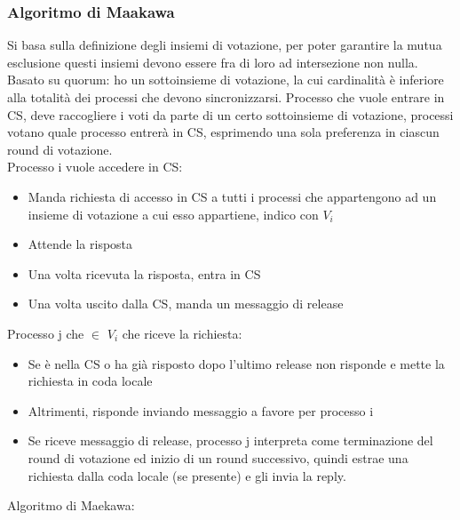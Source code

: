 \documentclass[16px]{article}
\begin{document}
\subsubsection{Algoritmo di Maakawa}
Si basa sulla definizione degli insiemi di votazione, per poter garantire la mutua esclusione questi insiemi devono essere fra di loro ad intersezione non nulla. Basato su quorum: ho un sottoinsieme di votazione, la cui cardinalità è inferiore alla totalità dei processi che devono sincronizzarsi. Processo che vuole entrare in CS, deve raccogliere i voti da parte di un certo sottoinsieme di votazione, processi votano quale processo entrerà in CS, esprimendo una sola preferenza in ciascun round di votazione.\\ Processo i vuole accedere in CS:
\begin{itemize}
\item Manda richiesta di accesso in CS a tutti i processi che appartengono ad un insieme di votazione a cui esso appartiene, indico con $V_i$
\item Attende la risposta
\item Una volta ricevuta la risposta, entra in CS
\item Una volta uscito dalla CS, manda un messaggio di release 
\end{itemize}
Processo j che $\in$ $V_i$ che riceve la richiesta:
\begin{itemize}
\item Se è nella CS o ha già risposto dopo l'ultimo release non risponde e mette la richiesta in coda locale
\item Altrimenti, risponde inviando messaggio a favore per processo i
\item Se riceve messaggio di release, processo j interpreta come terminazione del round di votazione ed inizio di un round successivo, quindi estrae una richiesta dalla coda locale (se presente) e gli invia la reply.
\end{itemize}
Algoritmo di Maekawa:
\end{document}
